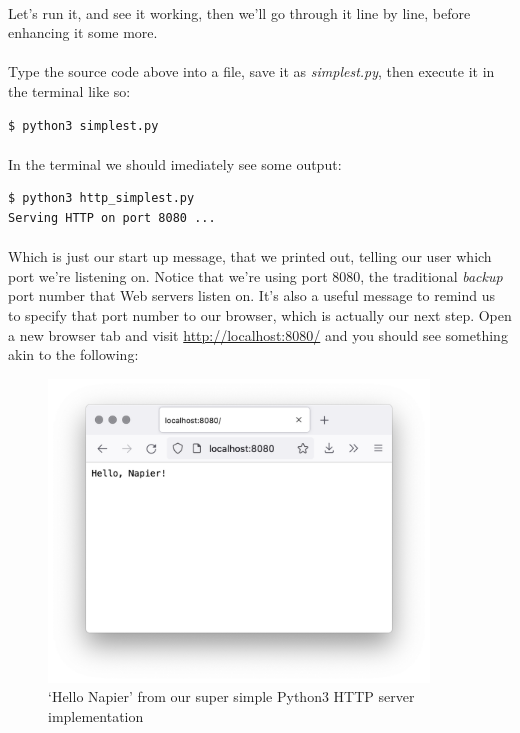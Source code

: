 \paragraph{} Let's run it, and see it working, then we'll go through it line by line, before enhancing it some more.

\paragraph{} Type the source code above into a file, save it as \emph{simplest.py}, then execute it in the terminal like so:

\begin{lstlisting}[style=DOS]
$ python3 simplest.py
\end{lstlisting}

\paragraph{} In the terminal we should imediately see some output:

\begin{lstlisting}[style=DOS]
$ python3 http_simplest.py 
Serving HTTP on port 8080 ...
\end{lstlisting}

\paragraph{} Which is just our start up message, that we printed out, telling our user which port we're listening on. Notice that we're using port 8080, the traditional \emph{backup} port number that Web servers listen on. It's also a useful message to remind us to specify that port number to our browser, which is actually our next step. Open a new browser tab and visit \url{http://localhost:8080/} and you should see something akin to the following:

\begin{figure}[H]
\centering
\includegraphics[width=0.9\textwidth]{images/http-simplest.png}
\caption{`Hello Napier' from our super simple Python3 HTTP server implementation}
\label{fig:http-simplest}
\end{figure}

